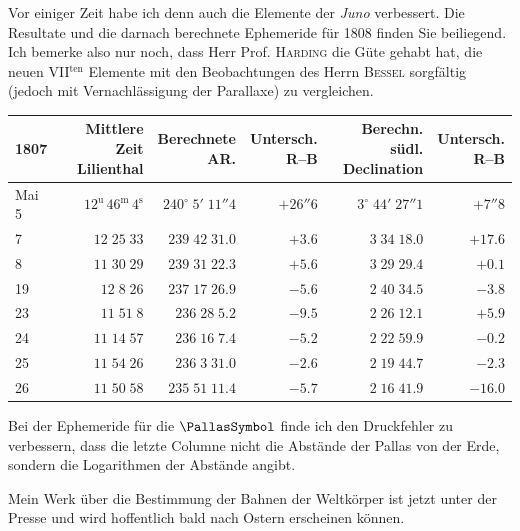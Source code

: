 \par\indent Vor einiger Zeit habe ich denn auch die Elemente der \emph{Juno} verbessert. Die Resultate und die
darnach berechnete Ephemeride für 1808 finden Sie beiliegend. Ich bemerke also nur noch, dass Herr
Prof. \textsc{Harding} die Güte gehabt hat, die neuen VII$^{\text{ten}}$ Elemente mit den
Beobachtungen des Herrn \textsc{Bessel} sorgfältig (jedoch mit Vernachlässigung der Parallaxe) zu
vergleichen.


\begin{center}\fontsize{9}{11}\selectfont\setlength{\tabcolsep}{2pt}\renewcommand{\arraystretch}{1.15}\begin{tabular}{l|r|r|r|r|r}
1807 & \shortstack{Mittlere Zeit\\Lilienthal} & \shortstack{Berechnete\\AR.} & \shortstack{Untersch.\\R--B} & \shortstack{Berechn. südl.\\Declination} & \shortstack{Untersch.\\R--B}\\\hline
Mai 5 & $12^{\text{u}}\,46^{\text{m}}\,4^{\text{s}}$ & $240^\circ\;5'\;11''4$ & $+26''6$ & $3^\circ\;44'\;27''1$ & $+7''8$\\
7 & $12\;25\;33$ & $239\;42\;31.0$ & $+3.6$ & $3\;34\;18.0$ & $+17.6$\\
8 & $11\;30\;29$ & $239\;31\;22.3$ & $+5.6$ & $3\;29\;29.4$ & $+0.1$\\
19 & $12\;8\;26$ & $237\;17\;26.9$ & $-5.6$ & $2\;40\;34.5$ & $-3.8$\\
23 & $11\;51\;8$ & $236\;28\;5.2$ & $-9.5$ & $2\;26\;12.1$ & $+5.9$\\
24 & $11\;14\;57$ & $236\;16\;7.4$ & $-5.2$ & $2\;22\;59.9$ & $-0.2$\\
25 & $11\;54\;26$ & $236\;3\;31.0$ & $-2.6$ & $2\;19\;44.7$ & $-2.3$\\
26 & $11\;50\;58$ & $235\;51\;11.4$ & $-5.7$ & $2\;16\;41.9$ & $-16.0$\\
\end{tabular}\end{center}

\par\indent Bei der Ephemeride für die $\PallasSymbol$ finde ich den Druckfehler zu verbessern, dass die letzte Columne
nicht die Abstände der Pallas von der Erde, sondern die Logarithmen der Abstände angibt.

\par\indent Mein Werk über die Bestimmung der Bahnen der Weltkörper ist jetzt unter der Presse und wird
hoffentlich bald nach Ostern erscheinen können.

